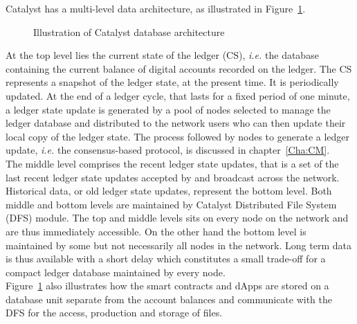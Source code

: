  Catalyst has a multi-level data architecture, as illustrated in Figure~\ref{fig:db}. 

\begin{figure}[H]
\label{fig:db}
\caption{\label{fig:db} Illustration of Catalyst database architecture}
\end{figure}

At the top level lies the current state of the ledger (CS), \textit{i.e.} the database containing the current balance of digital accounts recorded on the ledger. The CS represents a snapshot of the ledger state, at the present time. It is periodically updated. At the end of a ledger cycle, that lasts for a fixed period of one minute, a ledger state update is generated by a pool of nodes selected to manage the ledger database and distributed to the network users who can then update their local copy of the ledger state. The process followed by nodes to generate a ledger update, \textit{i.e.} the consensus-based protocol, is discussed in chapter~\ref{Cha:CM}.\\

The middle level comprises the recent ledger state updates, that is a set of the last recent ledger state updates accepted by and broadcast across the network. Historical data, or old ledger state updates, represent the bottom level. Both middle and bottom levels are maintained by Catalyst Distributed File System (DFS) module. The top and middle levels sits on every node on the network and are thus immediately accessible. On the other hand the bottom level is maintained by some but not necessarily all nodes in the network. Long term data is thus available with a short delay which constitutes a small trade-off for a compact ledger database maintained by every node.\\

Figure~\ref{fig:db} also illustrates how the smart contracts and dApps are stored on a database unit separate from the account balances and communicate with the DFS for the access, production and storage of files.

